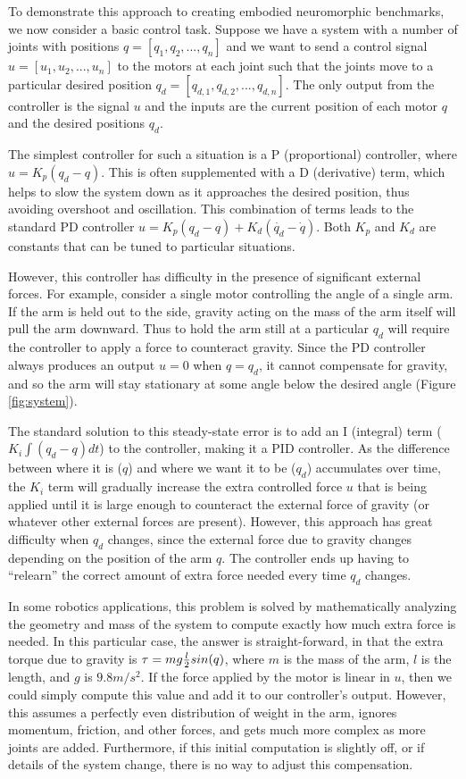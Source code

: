 \documentclass{frontiersSCNS} %
\begin{document}
To demonstrate this approach to creating embodied neuromorphic benchmarks,
we now consider a basic control task.  Suppose we have a system with a number
of joints with positions $q = [q_1, q_2, ..., q_n]$ and we want to send a control signal $u = [u_1, u_2, ..., u_n]$ to the motors at each joint
such that
the joints move to a particular desired position $q_d = [q_{d,1}, q_{d,2}, ..., q_{d,n}]$.  The only output from the controller is
the signal $u$ and the inputs are the current position
of each motor $q$ and the desired positions $q_d$.

The simplest controller for such a situation is a P (proportional) controller,
where $u=K_p(q_d - q)$.  This is often supplemented with a D (derivative) term,
which helps to slow the system down as it approaches the desired position,
thus avoiding overshoot and oscillation. This combination of terms leads to the
standard PD controller $u=K_p(q_d - q) + K_d(\dot{q_d} - \dot{q})$.
Both $K_p$ and $K_d$ are constants that can be
tuned to particular situations.

However, this controller has difficulty in the presence of significant external
forces.  For example, consider a single motor controlling the angle of a single
arm.  If the arm is held out to the side, gravity acting on the mass of the
arm itself will pull the arm downward.  Thus to hold the arm still at a
particular $q_d$ will require the controller to apply a force to counteract
gravity.  Since the PD controller always produces an output $u=0$ when $q=q_d$,
it cannot compensate for gravity, and so the arm will stay stationary at some
angle below the desired angle (Figure \ref{fig:system}).

The standard solution to this steady-state error is to add an I (integral) term ($K_i \int{(q_d-q) dt}$)
to the controller, making it a PID controller.  As the difference between where it is ($q$) and
where we want it to be ($q_d$) accumulates over time, the $K_i$ term will gradually increase
the extra controlled force $u$ that is being applied until it is large enough to counteract
the external force of gravity (or whatever other external forces are present).
However, this approach has great difficulty when $q_d$ changes, since the
external force due to gravity changes depending on the position of the arm $q$.
The controller ends up having to ``relearn'' the
correct amount of extra force needed every time $q_d$ changes.

In some robotics applications, this problem is solved by mathematically
analyzing the geometry and mass of the system to compute exactly how much extra
force is needed.  In this particular case, the answer is straight-forward,
in that the extra torque due to gravity is $\tau=mg {l \over 2} sin(q)$, where
$m$ is the mass of the arm, $l$ is the length, and $g$ is $9.8m/s^2$.  If the
force applied by the motor is linear in $u$, then we could simply compute this
value and add it to our controller's output.  However, this assumes a perfectly
even distribution of weight in the arm, ignores momentum, friction, and other forces, and 
gets much more complex as more joints are added.  Furthermore, if this
initial computation is slightly off, or if details of the system change,
there is no way to adjust this compensation.
\end{document}
